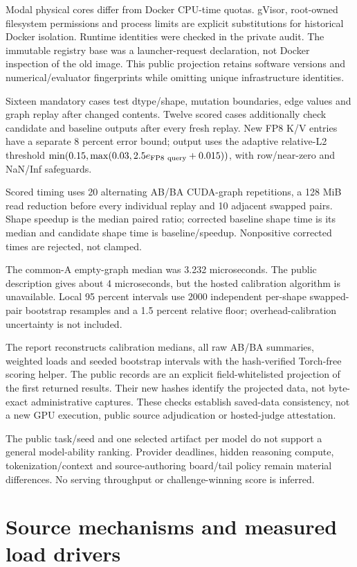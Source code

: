 \documentclass[11pt,letterpaper]{article}
\begin{document}
Modal physical cores differ from Docker CPU-time quotas. gVisor, root-owned filesystem permissions and process limits are explicit substitutions for historical Docker isolation. Runtime identities were checked in the private audit. The immutable registry base was a launcher-request declaration, not Docker inspection of the old image. This public projection retains software versions and numerical/evaluator fingerprints while omitting unique infrastructure identities.

Sixteen mandatory cases test dtype/shape, mutation boundaries, edge values and graph replay after changed contents. Twelve scored cases additionally check candidate and baseline outputs after every fresh replay. New FP8 K/V entries have a separate 8 percent error bound; output uses the adaptive relative-L2 threshold $\min(0.15,\max(0.03, 2.5e_{\rm FP8\ query}+0.015))$, with row/near-zero and NaN/Inf safeguards.

Scored timing uses 20 alternating AB/BA CUDA-graph repetitions, a 128 MiB read reduction before every individual replay and 10 adjacent swapped pairs. Shape speedup is the median paired ratio; corrected baseline shape time is its median and candidate shape time is baseline/speedup. Nonpositive corrected times are rejected, not clamped.

The common-A empty-graph median was 3.232 microseconds. The public description gives about 4 microseconds, but the hosted calibration algorithm is unavailable. Local 95 percent intervals use 2000 independent per-shape swapped-pair bootstrap resamples and a 1.5 percent relative floor; overhead-calibration uncertainty is not included.

The report reconstructs calibration medians, all raw AB/BA summaries, weighted loads and seeded bootstrap intervals with the hash-verified Torch-free scoring helper. The public records are an explicit field-whitelisted projection of the first returned results. Their new hashes identify the projected data, not byte-exact administrative captures. These checks establish saved-data consistency, not a new GPU execution, public source adjudication or hosted-judge attestation.

The public task/seed and one selected artifact per model do not support a general model-ability ranking. Provider deadlines, hidden reasoning compute, tokenization/context and source-authoring board/tail policy remain material differences. No serving throughput or challenge-winning score is inferred.

\section{Source mechanisms and measured load drivers}
\end{document}
